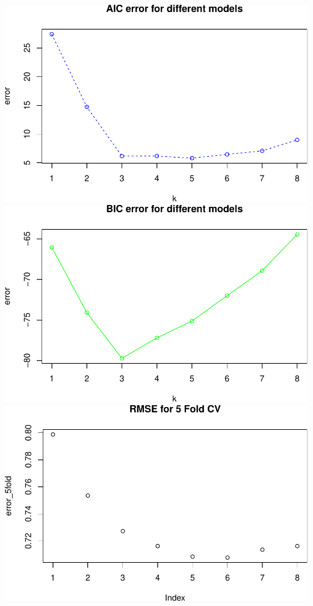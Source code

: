 \documentclass[]{article}
\begin{document}
\includegraphics{HW4_Solution_files/figure-latex/unnamed-chunk-1-1.pdf}
\includegraphics{HW4_Solution_files/figure-latex/unnamed-chunk-1-2.pdf}
\includegraphics{HW4_Solution_files/figure-latex/unnamed-chunk-2-1.pdf}
\end{document}
